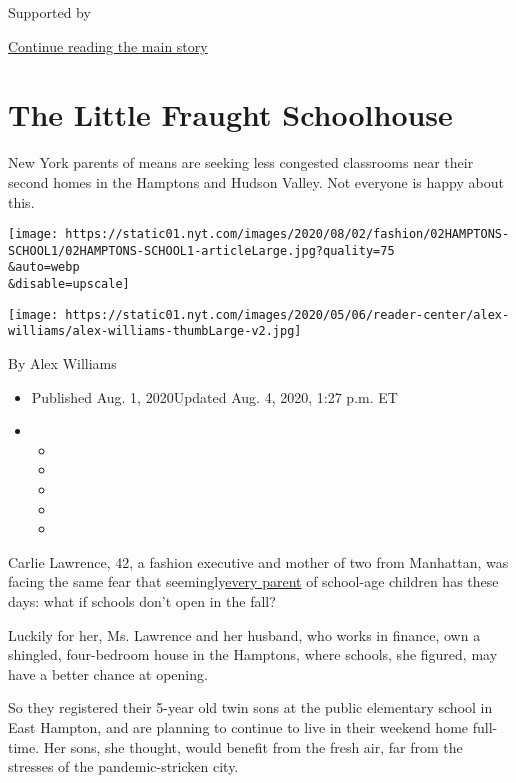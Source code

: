 Supported by

\protect\hyperlink{after-sponsor}{Continue reading the main story}

\hypertarget{the-little-fraught-schoolhouse}{%
\section{The Little Fraught
Schoolhouse}\label{the-little-fraught-schoolhouse}}

New York parents of means are seeking less congested classrooms near
their second homes in the Hamptons and Hudson Valley. Not everyone is
happy about this.

\texttt{[image: https://static01.nyt.com/images/2020/08/02/fashion/02HAMPTONS-SCHOOL1/02HAMPTONS-SCHOOL1-articleLarge.jpg?quality=75\\\&auto=webp\\\&disable=upscale]}

\texttt{[image: https://static01.nyt.com/images/2020/05/06/reader-center/alex-williams/alex-williams-thumbLarge-v2.jpg]}

By Alex Williams

\begin{itemize}
\item
  Published Aug. 1, 2020Updated Aug. 4, 2020, 1:27 p.m. ET
\item
  \begin{itemize}
  \item
  \item
  \item
  \item
  \item
  \end{itemize}
\end{itemize}

Carlie Lawrence, 42, a fashion executive and mother of two from
Manhattan, was facing the same fear that
seemingly\href{https://www.nytimes.com/2020/07/30/nyregion/pod-schools-hastings-on-hudson.html}{every
parent} of school-age children has these days: what if schools don't
open in the fall?

Luckily for her, Ms. Lawrence and her husband, who works in finance, own
a shingled, four-bedroom house in the Hamptons, where schools, she
figured, may have a better chance at opening.

So they registered their 5-year old twin sons at the public elementary
school in East Hampton, and are planning to continue to live in their
weekend home full-time. Her sons, she thought, would benefit from the
fresh air, far from the stresses of the pandemic-stricken city.

